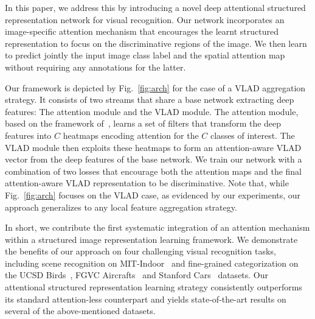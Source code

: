 \documentclass{bmvc2k}
\begin{document}
In this paper, we address this by introducing a novel deep attentional structured representation network for visual recognition. Our network incorporates an image-specific attention mechanism that encourages the learnt structured representation to focus on the discriminative regions of the image. We then learn to predict jointly the input image class label and the spatial attention map without requiring any annotations for the latter. 

Our framework is depicted by Fig.~\ref{fig:arch} for the case of a VLAD aggregation strategy. It consists of two streams that share a base network extracting deep features: The attention module and the VLAD module. The attention module, based on the framework of~\cite{Attpool}, learns a set of filters that transform the deep features into $C$ heatmaps encoding attention for the $C$ classes of interest. The VLAD module then exploits these heatmaps to form an attention-aware VLAD vector from the deep features of the base network. We train our network with a combination of two losses that encourage both the attention maps and the final attention-aware VLAD representation to be discriminative. Note that, while Fig.~\ref{fig:arch} focuses on the VLAD case, as evidenced by our experiments, our approach generalizes to any local feature aggregation strategy.

In short, we contribute the first systematic integration of an attention mechanism within a structured image representation learning framework. We demonstrate the benefits of our approach on four challenging visual recognition tasks, including scene recognition on MIT-Indoor~\cite{mitindoor2009} and fine-grained categorization on the UCSD Birds~\cite{ucsdbirds}, FGVC Aircrafts~\cite{aircraft} and Stanford Cars~\cite{stanfordcars} datasets. Our attentional structured representation learning strategy consistently outperforms its standard attention-less counterpart and yields state-of-the-art results on several of the above-mentioned datasets.
\end{document}
